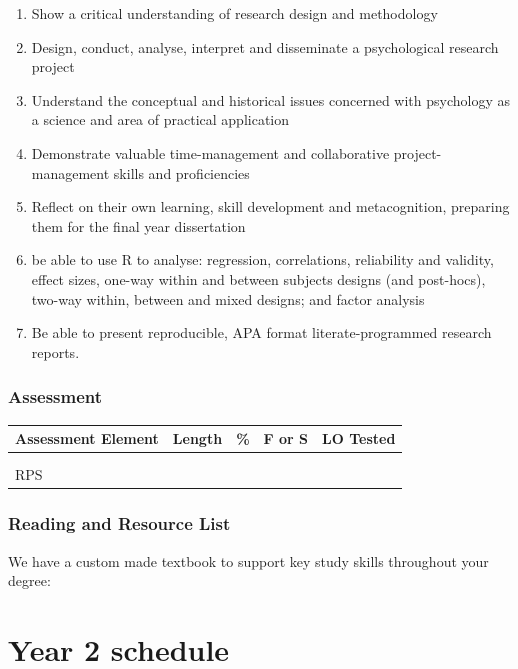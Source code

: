 \documentclass[
  11pt,
  letterpaper,
  oneside,
  open=any]{scrbook}
\begin{document}
\begin{enumerate}
\def\labelenumi{\arabic{enumi}.}
\item
  Show a critical understanding of research design and methodology
\item
  Design, conduct, analyse, interpret and disseminate a psychological
  research project
\item
  Understand the conceptual and historical issues concerned with
  psychology as a science and area of practical application
\item
  Demonstrate valuable time-management and collaborative
  project-management skills and proficiencies
\item
  Reflect on their own learning, skill development and metacognition,
  preparing them for the final year dissertation
\item
  be able to use R to analyse: regression, correlations, reliability and
  validity, effect sizes, one-way within and between subjects designs
  (and post-hocs), two-way within, between and mixed designs; and factor
  analysis
\item
  Be able to present reproducible, APA format literate-programmed
  research reports.
\end{enumerate}

\hypertarget{assessment-1}{%
\subsection{Assessment}\label{assessment-1}}

\begin{longtable}[]{@{}lllll@{}}
\toprule()
Assessment Element & Length & \% & F or S & LO Tested \\
\midrule()
\endhead
& & & & \\
& & & & \\
RPS & & & & \\
\bottomrule()
\end{longtable}

\hypertarget{reading-and-resource-list-1}{%
\subsection{Reading and Resource
List}\label{reading-and-resource-list-1}}

We have a custom made textbook to support key study skills throughout
your degree:

\hypertarget{year-2-schedule}{%
\chapter{Year 2 schedule}\label{year-2-schedule}}
\end{document}
